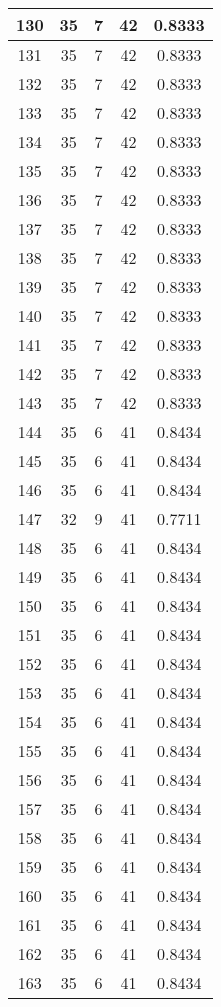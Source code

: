 \documentclass[letterpaper, 12pt]{article}
\begin{document}
\begin{longtable}{|c|c|c|c|c|}
\hline
130 & 35 & 7 & 42 & 0.8333 \\
\hline
131 & 35 & 7 & 42 & 0.8333 \\
\hline
132 & 35 & 7 & 42 & 0.8333 \\
\hline
133 & 35 & 7 & 42 & 0.8333 \\
\hline
134 & 35 & 7 & 42 & 0.8333 \\
\hline
135 & 35 & 7 & 42 & 0.8333 \\
\hline
136 & 35 & 7 & 42 & 0.8333 \\
\hline
137 & 35 & 7 & 42 & 0.8333 \\
\hline
138 & 35 & 7 & 42 & 0.8333 \\
\hline
139 & 35 & 7 & 42 & 0.8333 \\
\hline
140 & 35 & 7 & 42 & 0.8333 \\
\hline
141 & 35 & 7 & 42 & 0.8333 \\
\hline
142 & 35 & 7 & 42 & 0.8333 \\
\hline
143 & 35 & 7 & 42 & 0.8333 \\
\hline
144 & 35 & 6 & 41 & 0.8434 \\
\hline
145 & 35 & 6 & 41 & 0.8434 \\
\hline
146 & 35 & 6 & 41 & 0.8434 \\
\hline
147 & 32 & 9 & 41 & 0.7711 \\
\hline
148 & 35 & 6 & 41 & 0.8434 \\
\hline
149 & 35 & 6 & 41 & 0.8434 \\
\hline
150 & 35 & 6 & 41 & 0.8434 \\
\hline
151 & 35 & 6 & 41 & 0.8434 \\
\hline
152 & 35 & 6 & 41 & 0.8434 \\
\hline
153 & 35 & 6 & 41 & 0.8434 \\
\hline
154 & 35 & 6 & 41 & 0.8434 \\
\hline
155 & 35 & 6 & 41 & 0.8434 \\
\hline
156 & 35 & 6 & 41 & 0.8434 \\
\hline
157 & 35 & 6 & 41 & 0.8434 \\
\hline
158 & 35 & 6 & 41 & 0.8434 \\
\hline
159 & 35 & 6 & 41 & 0.8434 \\
\hline
160 & 35 & 6 & 41 & 0.8434 \\
\hline
161 & 35 & 6 & 41 & 0.8434 \\
\hline
162 & 35 & 6 & 41 & 0.8434 \\
\hline
163 & 35 & 6 & 41 & 0.8434 \\

\end{longtable}
\end{document}
